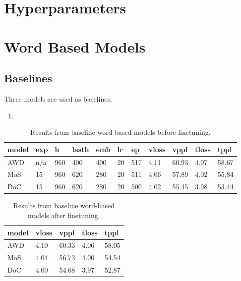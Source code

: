 \section{Hyperparameters}

\section{Word Based Models}

\subsection{Baselines}

Three models are used as baselines.
\begin{enumerate}
    \item 
\end{enumerate}

\begin{table}[]
\caption{Results from baseline word-based models before finetuning.}
\begin{tabular}{|l|l|l|l|l|l|l|l|l|l|l|}
\hline
\textbf{model}    & \textbf{exp} & \textbf{h}   & \textbf{lasth} & \textbf{emb} & \textbf{lr} & \textbf{ep}  & \textbf{vloss} & \textbf{vppl}  & \textbf{tloss} & \textbf{tppl}  \\ \hline
AWD      & n/a & 960 & 400   & 400 & 20 & 517 & 4.11  & 60.93 & 4.07  & 58.67 \\ \hline
MoS      & 15  & 960 & 620   & 280 & 20 & 511 & 4.06  & 57.89 & 4.02  & 55.84 \\ \hline
DoC      & 15  & 960 & 620   & 280 & 20 & 500 & 4.02  & 55.45 & 3.98  & 53.44 \\ \hline
\end{tabular}
\end{table}

\begin{table}[]
\centering
\caption{Results from baseline word-based models after finetuning.}
\begin{tabular}{|l|l|l|l|l|}
\hline
\textbf{model} & \textbf{vloss} & \textbf{vppl}  & \textbf{tloss} & \textbf{tppl}  \\ \hline
AWD   & 4.10  & 60.33 & 4.06  & 58.05 \\ \hline
MoS   & 4.04  & 56.73 & 4.00  & 54.54 \\ \hline
DoC   & 4.00  & 54.68 & 3.97  & 52.87 \\ \hline
\end{tabular}
\end{table}


